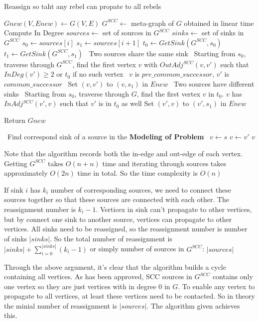 \documentclass[12pt,a4paper]{article}
\renewcommand{\Comment}[1]{\beginComment~#1~\endComment}
\begin{document}
\begin{algorithm}
\caption{Reassign so taht any rebel can propate to all rebels}
\begin{algorithmic}
    \State $Gnew(V,Enew) \gets G(V,E)$
    \State $G^{SCC} \gets$ meta-graph of $G$ obtained in linear time
    \State Compute In Degree 
    \State $sources \gets$ set of sources in $G^{SCC}$
    \State $sinks \gets$ set of sinks in $G^{SCC}$
      \State $s_0 \gets sources[i]$
      \State $s_1 \gets sources[i + 1]$
      \State $t_0 \gets GetSink(G^{SCC}, s_0)$
      \State $t_1 \gets GetSink(G^{SCC}, s_1)$
        \State \Comment{Two sources share the same sink}
        \State Starting from $s_0$, traverse through $G^{SCC}$, find the first vertex $v$ with
        \State $OutAdj^{SCC}(v,v')$ such that $InDeg(v') \ge 2$ or $t_0$ if no such vertex
        \State \Comment{$v$ is $pre\_common\_successor$, $v'$ is $common\_successor$}
        \State Set $(v, v')$ to $(v,s_1)$ in $Enew$
      \Else 
      \State \Comment{Two sources have different sinks}
        \State Starting from $s_0$, traverse through $G$, find the first vertex $v$ in $t_0$. 
        \State $v$ has $InAdj^{SCC}(v',v)$ such that $v'$ is in $t_0$ as well
        \State Set $(v',v)$ to $(v', s_1)$ in $Enew$

      \EndIf

    \EndFor
    \State Return $Gnew$
  \EndFunction

  \vspace{0.4cm}

  \State \Comment{Find correspond sink of a source in the \textbf{Modeling of Problem}}
    \State $v \gets s$
      \State $v \gets v'$
    \EndWhile
    \State \Return $v$
  \EndFunction
\end{algorithmic}
\end{algorithm}

Note that the algorithm records both the in-edge and out-edge of each vertex. Getting $G^{SCC}$ takes $O(n + n)$ time and iterating through sources takes approximately $O(2n)$ time in total. So the time complexity is $O(n)$

If sink $i$ has $k_i$ number of corresponding sources, we need to connect these sources together so that these sources are connected with each other. The reassignment number is $k_i - 1$.
Verticex in sink can't propagate to other vertices, but by connect one sink to another source, vertices can propagate to other vertices. All sinks need to be reassigned, so the reassignment number is number of sinks $|sinks|$. So the total number of reassignment is $|sinks| + \sum_{i = 0}^{|sinks|}(k_i - 1)$ or simply number of sources in $G^{SCC}$: $|sources|$

Through the above argument, it's clear that the algorithm builds a cycle containing all vertices. As has been approved, SCC sources in $G^{SCC}$ contains only one vertex so they are just vertices with in degree 0 in $G$. To enable any vertex to propagate to all vertices, at least these vertices need to be contacted. So in theory the minial number of reassignment is $|sources|$. The algorithm given achieves this.
\end{document}
